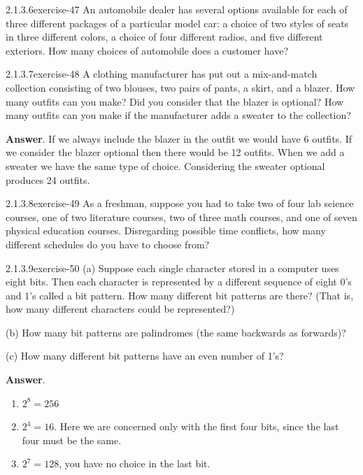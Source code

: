 \documentclass[twoside,10pt,]{book}
\numberwithin{equation}{section}
\begin{document}
\begin{divisionsolution}{2.1.3.6}{}{exercise-47}%
\hypertarget{p-588}{}%
An automobile dealer has several options available for each of three different packages of a particular model car: a choice of two styles of seats in three different colors, a choice of four different radios, and five different exteriors. How many choices of automobile does a customer have?%
\end{divisionsolution}%
\begin{divisionsolution}{2.1.3.7}{}{exercise-48}%
\hypertarget{p-589}{}%
A clothing manufacturer has put out a mix-and-match collection consisting of two blouses, two pairs of pants, a skirt, and a blazer. How many outfits can you make? Did you consider that the blazer is optional? How many outfits can you make if the manufacturer adds a sweater to the collection?%
\par\smallskip%
\noindent\textbf{Answer}.\quad%
\hypertarget{p-590}{}%
If we always include the blazer in the outfit we would have 6 outfits. If we consider the blazer optional then there would be 12 outfits. When we add a sweater we have the same type of choice. Considering the sweater optional produces 24 outfits.%
\end{divisionsolution}%
\begin{divisionsolution}{2.1.3.8}{}{exercise-49}%
\hypertarget{p-591}{}%
As a freshman, suppose you had to take two of four lab science courses, one of two literature courses, two of three math courses, and one of seven physical education courses. Disregarding possible time conflicts, how many different schedules do you have to choose from?%
\end{divisionsolution}%
\begin{divisionsolution}{2.1.3.9}{}{exercise-50}%
\hypertarget{p-592}{}%
(a) Suppose each single character stored in a computer uses eight bits. Then each character is represented by a different sequence of eight 0's and 1's called a bit pattern. How many different bit patterns are there? (That is, how many different characters could be represented?)%
\par
\hypertarget{p-593}{}%
(b) How many bit patterns are palindromes (the same backwards as forwards)?%
\par
\hypertarget{p-594}{}%
(c) How many different bit patterns have an even number of 1's?%
\par\smallskip%
\noindent\textbf{Answer}.\quad%
\hypertarget{p-595}{}%
\leavevmode%
\begin{enumerate}[label=(\alph*)]
\item\hypertarget{li-399}{}\hypertarget{p-596}{}%
\(2^8=256\)%
\item\hypertarget{li-400}{}\hypertarget{p-597}{}%
\(2^4=16\). Here we are concerned only with the first four bits, since the last four must be the same.%
\item\hypertarget{li-401}{}\hypertarget{p-598}{}%
\(2^7=128\), you have no choice in the last bit.%
\end{enumerate}
%
\end{divisionsolution}%
\end{document}
